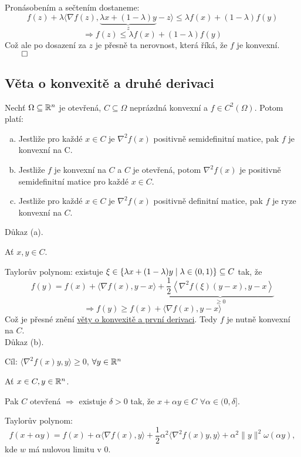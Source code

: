 Pronásobením a sečtením dostaneme:
\[
    f(z) + \lambda \langle \nabla f(z), \underbrace{\lambda x + (1-\lambda)y}_{z} - z\rangle \leq \lambda f(x) + 
    (1-\lambda)f(y)
\]
\[
    \Rightarrow f(z) \leq \lambda f(x) + (1-\lambda)f(y)
\]
Což ale po dosazení za $z$ je přesně ta nerovnost, která říká, že $f$ je konvexní. $\qed$

\subsection{Věta o konvexitě a druhé derivaci}\label{konvDDeriv}
Nechť $\Omega \subseteq \mathbb{R}^n$ je otevřená, $C \subseteq \Omega$ neprázdná konvexní a $f \in C^{2} (\Omega)$. Potom platí:
\begin{enumerate}[(a)]
    \item Jestliže pro každé $x \in C$ je $\nabla^2 f(x)$ positivně semidefinitní matice, pak $f$ je konvexní na C.
    \item Jestliže $f$ je konvexní na $C$ a $C$ je otevřená, potom $\nabla^2 f(x)$ je positivně semidefinitní matice pro 
    každé $x \in C$.
    \item Jestliže pro každé $x \in C$ je $\nabla^2 f(x)$ positivně definitní matice, pak $f$ je ryze konvexní na $C$. 
\end{enumerate}

Důkaz (a).

Ať $x, y \in C$.

Taylorův polynom: existuje $\xi \in \left\lbrace \lambda x + (1-\lambda)y \mid \lambda \in (0,1) \right\rbrace \subseteq C$ tak, že
\[
    f(y) = f(x) + \langle \nabla f(x), y-x\rangle + \underbrace{\frac{1}{2} \left\langle \nabla^2 f(\xi) (y-x), 
    y-x\right\rangle}_{\geq 0}
\]
\[
    \Rightarrow f(y) \geq f(x) + \langle \nabla f(x), y-x\rangle
\]
Což je přesné znění \hyperref[konvDeriv]{věty o konvexitě a první derivaci}. Tedy $f$ je nutně konvexní na $C$. 
\\

\newpage
Důkaz (b).

Cíl: $\langle \nabla^2 f(x)y, y\rangle \geq 0$, $\forall y \in \mathbb{R}^n$

Ať $x \in C, y \in \mathbb{R}^n$.

Pak
$C$ otevřená $\Rightarrow$ existuje $\delta > 0$ tak, že $x + \alpha y \in C$ $\forall \alpha \in (0, \delta]$.

Taylorův polynom: 
\[
    f(x+ \alpha y) = f(x) + \alpha \langle \nabla f(x), y\rangle + \frac{1}{2}\alpha^2 \langle \nabla^2 f(x)y, y\rangle
    + \alpha^2 \| y\|^2 \omega(\alpha y),
\]
kde $w$ má nulovou limitu v $0$.

